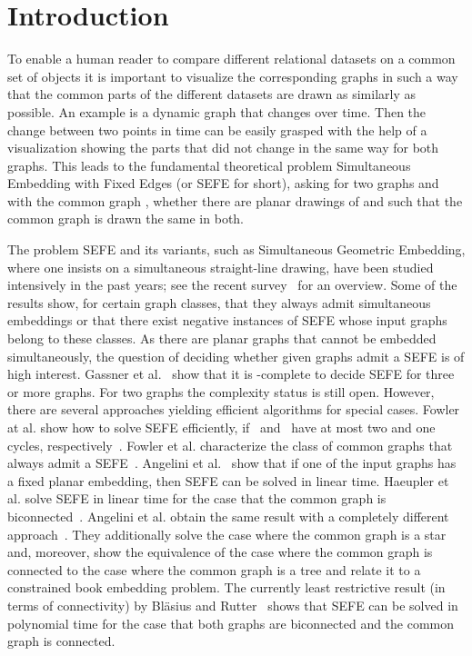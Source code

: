 \documentclass{scrartcl}
\newcommand{\1}[1]{{\normalfont \ensuremath{#1^{\tiny\circled{1}}}}} \newcommand{\2}[1]{{\normalfont \ensuremath{#1^{\tiny\circled{2}}}}} \renewcommand{\k}[1]{{\normalfont \ensuremath{#1^{\tiny\circled{k}}}}} \newcommand{\proj}[2]{\ensuremath{\left.#1\right|_{#2}}} \newcommand{\eps}{\varepsilon}
\theoremstyle{plain} \newtheorem{theorem}{Theorem} \newcounter{lemmacounter} \setcounter{lemmacounter}{0} \newtheorem{lemma}[lemmacounter]{Lemma} \newtheorem{fact}{Fact}  \newtheorem{corollary}{Corollary} \theoremstyle{definition} \newtheorem{definition}{Definition}
\begin{document}
\section{Introduction}
\label{sec:introduction}

To enable a human reader to compare different relational datasets on a
common set of objects it is important to visualize the corresponding
graphs in such a way that the common parts of the different datasets
are drawn as similarly as possible.  An example is a dynamic graph
that changes over time.  Then the change between two points in time
can be easily grasped with the help of a visualization showing the
parts that did not change in the same way for both graphs.  This leads
to the fundamental theoretical problem {\sc Simultaneous Embedding
  with Fixed Edges} (or {\sc SEFE} for short), asking for two graphs
 and  with the common graph , whether there are planar
drawings of  and  such that the common graph  is drawn
the same in both.

The problem {\sc SEFE} and its variants, such as {\sc Simultaneous
  Geometric Embedding}, where one insists on a simultaneous
straight-line drawing, have been studied intensively in the past
years; see the recent survey~\cite{bkr-sepg-13} for an overview.  Some
of the results show, for certain graph classes, that they always admit
simultaneous embeddings or that there exist negative instances of SEFE
whose input graphs belong to these classes.  As there are planar
graphs that cannot be embedded simultaneously, the question of
deciding whether given graphs admit a {\sc SEFE} is of high interest.
Gassner et al.~\cite{SimultaneousGraphEmbeddings-Gassner.etal(06)}
show that it is -complete to decide {\sc SEFE} for
three or more graphs.  For two graphs the complexity status is still
open.  However, there are several approaches yielding efficient
algorithms for special cases.  Fowler at al. show how to solve {\sc
  SEFE} efficiently, if~ and~ have at most two and one cycles,
respectively~\cite{SPQR-TreeApproachto-Fowler.etal(09)}.  Fowler et
al. characterize the class of common graphs that always admit a {\sc
  SEFE}~\cite{Characterizationsofrestricted-Fowler.etal(11)}.
Angelini et al.~\cite{adf-tppeg-10} show that if one of the input
graphs has a fixed planar embedding, then {\sc SEFE} can be solved in
linear time.  Haeupler et al. solve {\sc SEFE} in linear time for the
case that the common graph is
biconnected~\cite{TestingSimultaneousPlanarity-Haeupler.etal(10)}.
Angelini et al. obtain the same result with a completely different
approach~\cite{adfpr-tsegi-12}.  They additionally solve the case
where the common graph is a star and, moreover, show the equivalence
of the case where the common graph is connected to the case where the
common graph is a tree and relate it to a constrained book embedding
problem.  The currently least restrictive result (in terms of
connectivity) by Bläsius and Rutter~\cite{br-spqoacep-13} shows that
{\sc SEFE} can be solved in polynomial time for the case that both
graphs are biconnected and the common graph is connected.
\end{document}
